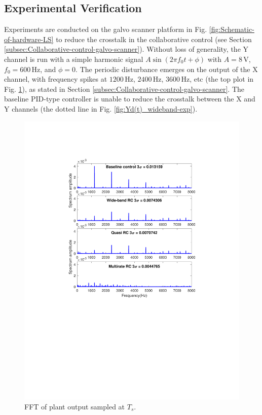 \documentclass [11pt, proquest] {uwthesis}[2020/02/24]
\begin{document}
\subsection{Experimental Verification} \label{subsec:Experimental-Verification-Galvo-Scanner}

Experiments are conducted on the galvo scanner platform in Fig. \ref{fig:Schematic-of-hardware-LS} to reduce the crosstalk in the collaborative
control (see Section \ref{subsec:Collaborative-control-galvo-scanner}).
Without loss of generality, the Y channel is run with a simple harmonic
signal $A\sin(2\pi f_{0}t+\phi)$ with $A=8\,\text{V}$, $f_{0}=600\,\text{Hz}$,
and $\phi=0$. The periodic disturbance emerges on the output of the
X channel, with frequency spikes at $1200\,\text{Hz}$, $2400\,\text{Hz}$,
$3600\,\text{Hz}$, etc (the top plot in Fig. \ref{fig:FFT-exp}),
as stated in Section \ref{subsec:Collaborative-control-galvo-scanner}.
The baseline PID-type controller is unable to reduce the crosstalk
between the X and Y channels (the dotted line in Fig. \ref{fig:Yd(t)_wideband-exp}).
\begin{figure}[!ht]
\begin{centering}
\includegraphics[width=12cm]{Fractional-order-RC/Spectrum_all_exp}
\par\end{centering}
\caption{\label{fig:FFT-exp}FFT of plant output sampled at $T_{s}$.}
\end{figure}
\end{document}
